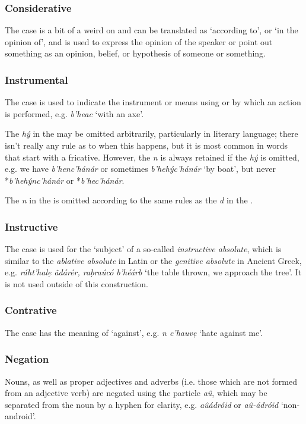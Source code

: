 \documentclass[a4paper, 12pt, twoside, final]{article}
\let \w \textit
\begin{document}
\subsubsection{Considerative}
The  case is a bit of a weird on and can be translated as ‘according to’, or ‘in the opinion of’, and is used to
express the opinion of the speaker or point out something as an opinion, belief, or hypothesis of someone or something.

\subsubsection{Instrumental}
The  case is used to indicate the instrument or means using or by which an action is performed, e.g. \w{b’heac}
‘with an axe’.

The \w{hý} in the  may be omitted arbitrarily, particularly in literary language; there
isn’t really any rule as to when this happens, but it is most common in words that start with a fricative. However, the \w{n}
is always retained if the \w{hý} is omitted, e.g. we have \w{b’henc’hánár} or sometimes \w{b’hehýc’hánár} ‘by boat’, but never
*\w{b’hehýnc’hánár} or *\w{b’hec’hánár}.

The \w{n} in the  is omitted according to the same rules as the \w{d} in the .

\subsubsection{Instructive}
The  case is used for the ‘subject’ of a so-called \textit{instructive absolute}, which is similar to the
\textit{ablative absolute} in Latin or the \textit{genitive absolute} in Ancient Greek, e.g. \w{ráht’halẹ âdárér,
raḅraúcó b’héárb} ‘the table thrown, we approach the tree’. It is not used outside of this construction.

\subsubsection{Contrative}
The  case has the meaning of ‘against’, e.g. \w{n c’hauvẹ} ‘hate against me’.

\subsubsection{Negation}\label{subsubsec:noun-negation}
Nouns, as well as proper adjectives and adverbs (i.e. those which are not formed from an adjective verb) are negated
using the particle \w{aû}, which may be separated from the noun by a hyphen for clarity, e.g. \w{aûádróid} or \w{aû-ádróid}
‘non-android’.
\end{document}
